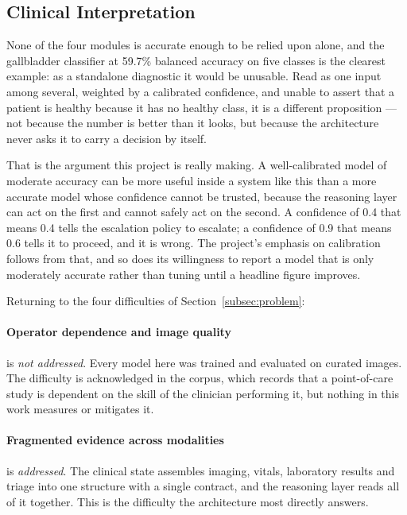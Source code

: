 \subsection{Clinical Interpretation}
\label{subsec:results-discussion}

None of the four modules is accurate enough to be relied upon alone, and the gallbladder
classifier at 59.7\% balanced accuracy on five classes is the clearest example: as a
standalone diagnostic it would be unusable. Read as one input among several, weighted by a
calibrated confidence, and unable to assert that a patient is healthy because it has no
healthy class, it is a different proposition --- not because the number is better than it
looks, but because the architecture never asks it to carry a decision by itself.

That is the argument this project is really making. A well-calibrated model of moderate
accuracy can be more useful inside a system like this than a more accurate model whose
confidence cannot be trusted, because the reasoning layer can act on the first and cannot
safely act on the second. A confidence of 0.4 that means 0.4 tells the escalation policy to
escalate; a confidence of 0.9 that means 0.6 tells it to proceed, and it is wrong. The
project's emphasis on calibration follows from that, and so does its willingness to report a
model that is only moderately accurate rather than tuning until a headline figure improves.

Returning to the four difficulties of Section~\ref{subsec:problem}:

\paragraph{Operator dependence and image quality} is \emph{not addressed}. Every model here
was trained and evaluated on curated images. The difficulty is acknowledged in the corpus,
which records that a point-of-care study is dependent on the skill of the clinician
performing it, but nothing in this work measures or mitigates it.

\paragraph{Fragmented evidence across modalities} is \emph{addressed}. The clinical state
assembles imaging, vitals, laboratory results and triage into one structure with a single
contract, and the reasoning layer reads all of it together. This is the difficulty the
architecture most directly answers.

